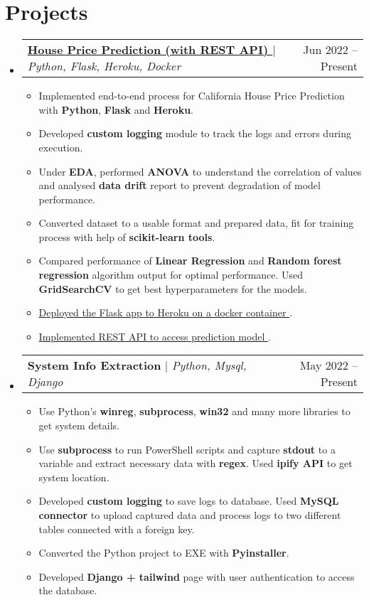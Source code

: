 \documentclass[letterpaper,11pt]{article}
\makeatletter
\newcommand{\resumeItem}[1]{
  \item\small{
    {#1 \vspace{-2pt}}
  }
}
\newcommand{\resumeProjectHeading}[2]{
    \item
    \begin{tabular*}{0.97\textwidth}{l@{\extracolsep{\fill}}r}
      \small#1 & #2 \\
    \end{tabular*}\vspace{-7pt}
}
\newcommand{\resumeSubHeadingListStart}{\begin{itemize}[leftmargin=0.15in, label={}]}
\newcommand{\resumeSubHeadingListEnd}{\end{itemize}}
\newcommand{\resumeItemListStart}{\begin{itemize}}
\newcommand{\resumeItemListEnd}{\end{itemize}\vspace{-5pt}}
\makeatother
\begin{document}
\section{Projects}
    \resumeSubHeadingListStart
      \resumeProjectHeading
          {\textbf{\href{https://github.com/bheemaguli/House-Price-Prediction}{House Price Prediction (with REST API) {\tiny \faLink}}} $|$ \emph{Python, Flask, Heroku, Docker}}{Jun 2022 -- Present}
          \resumeItemListStart
            \resumeItem{Implemented end-to-end process for California House Price Prediction with {\bfseries{Python}}, {\bfseries{Flask}} and {\bfseries{Heroku}}.}
            \resumeItem{Developed {\bfseries{custom logging}} module to track the logs and errors during execution.}
            \resumeItem{Under {\bfseries{EDA}}, performed {\bfseries{ANOVA}} to understand the correlation of values and analysed {\bfseries{data drift}} report to prevent degradation of model performance.}
            \resumeItem{Converted dataset to a usable format and prepared data, fit for training process with help of {\bfseries{scikit-learn tools}}.}
            \resumeItem{Compared performance of {\bfseries{Linear Regression}} and {\bfseries{Random forest regression}} algorithm output for optimal performance. Used {\bfseries{GridSearchCV}} to get best hyperparameters for the models.}
            \resumeItem{\href{https://house-price-prediction-bhem.herokuapp.com/}{Deployed the Flask app to Heroku on a docker container {\tiny \faLink}}.}
            \resumeItem{\href{https://house-price-prediction-bhem.herokuapp.com/docs/api}{Implemented REST API to access prediction model {\tiny \faLink}}.}
          \resumeItemListEnd
      \resumeProjectHeading
          {\textbf{System Info Extraction} $|$ \emph{Python, Mysql, Django}}{May 2022 -- Present}
          \resumeItemListStart
            \vspace{4pt}
            \begin{adjustwidth*}{-0.5cm}{-0.5cm}{Client: Dubai based Large Commodity Trading Company}\vspace{-2pt}\end{adjustwidth*}
            \resumeItem{Use Python's {\bfseries{winreg}}, {\bfseries{subprocess}}, {\bfseries{win32}} and many more libraries to get system details.}
            \resumeItem{Use {\bfseries{subprocess}} to run PowerShell scripts and capture {\bfseries{stdout}} to a variable and extract necessary data with {\bfseries{regex}}. Used {\bfseries{ipify API}} to get system location.}
            \resumeItem{Developed {\bfseries{custom logging}} to save logs to database. Used {\bfseries{MySQL connector}} to upload captured data and process logs to two different tables connected with a foreign key.}
            \resumeItem{Converted the Python project to EXE with {\bfseries{Pyinstaller}}.}
            \resumeItem{Developed {\bfseries{Django + tailwind}} page with user authentication to access the database.}
          \resumeItemListEnd
    \resumeSubHeadingListEnd
\end{document}
